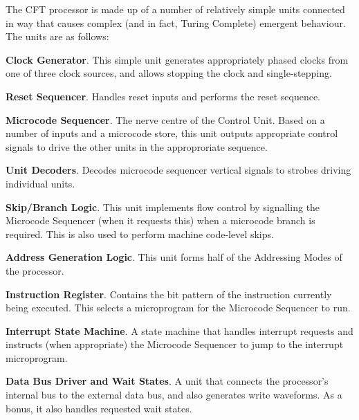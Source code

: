 The CFT processor is made up of a number of relatively simple units connected
in way that causes complex (and in fact, Turing Complete) emergent
behaviour. The units are as follows:

\begin{description}
  \item{\bfseries Clock Generator}. This simple unit generates appropriately
    phased clocks from one of three clock sources, and allows stopping the
    clock and single-stepping.

  \item{\bfseries Reset Sequencer}. Handles reset inputs and performs the reset
    sequence.

  \item{\bfseries Microcode Sequencer}. The nerve centre of the Control
    Unit. Based on a number of inputs and a microcode store, this unit outputs
    appropriate control signals to drive the other units in the approproriate
    sequence.

  \item{\bfseries Unit Decoders}. Decodes microcode sequencer vertical signals
    to strobes driving individual units.

  \item{\bfseries Skip/Branch Logic}. This unit implements flow control by
    signalling the Microcode Sequencer (when it requests this) when a microcode
    branch is required. This is also used to perform \gls{machine code}-level
    skips.

  \item{\bfseries Address Generation Logic}. This unit forms half of the
    \glspl{Addressing Mode} of the processor.

  \item{\bfseries Instruction Register}. Contains the bit pattern of the
    instruction currently being executed. This selects a microprogram for the
    Microcode Sequencer to run.

  \item{\bfseries Interrupt State Machine}. A state machine that handles
    interrupt requests and instructs (when appropriate) the Microcode Sequencer
    to jump to the interrupt microprogram.

  \item{\bfseries Data Bus Driver and Wait States}. A unit that connects the
    processor's internal bus to the external data bus, and also generates write
    waveforms. As a bonus, it also handles requested wait states.


\end{description}
